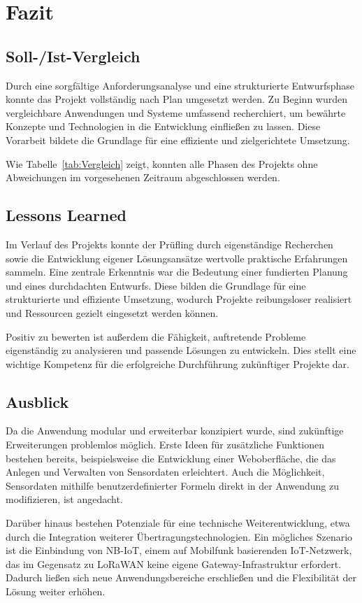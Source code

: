 \section{Fazit} 
\label{sec:Fazit}

\subsection{Soll-/Ist-Vergleich}
\label{sec:SollIstVergleich}
	Durch eine sorgfältige Anforderungsanalyse und eine strukturierte Entwurfsphase konnte das Projekt vollständig nach Plan umgesetzt werden.
	Zu Beginn wurden vergleichbare Anwendungen und Systeme umfassend recherchiert,
	um bewährte Konzepte und Technologien in die Entwicklung einfließen zu lassen.
	Diese Vorarbeit bildete die Grundlage für eine effiziente und zielgerichtete Umsetzung.

	Wie Tabelle~\ref{tab:Vergleich} zeigt, konnten alle Phasen des Projekts ohne Abweichungen im vorgesehenen Zeitraum abgeschlossen werden.
	

\subsection{Lessons Learned}
\label{sec:LessonsLearned}
	Im Verlauf des Projekts konnte der Prüfling durch eigenständige Recherchen sowie die Entwicklung eigener Lösungsansätze
	wertvolle praktische Erfahrungen sammeln. Eine zentrale Erkenntnis war die Bedeutung einer fundierten Planung und eines durchdachten Entwurfs.
	Diese bilden die Grundlage für eine strukturierte und effiziente Umsetzung,
	wodurch Projekte reibungsloser realisiert und Ressourcen gezielt eingesetzt werden können.

	Positiv zu bewerten ist außerdem die Fähigkeit, auftretende Probleme eigenständig zu analysieren und passende Lösungen zu entwickeln.
	Dies stellt eine wichtige Kompetenz für die erfolgreiche Durchführung zukünftiger Projekte dar.


\subsection{Ausblick}
\label{sec:Ausblick}
	Da die Anwendung modular und erweiterbar konzipiert wurde, sind zukünftige Erweiterungen problemlos möglich.
	Erste Ideen für zusätzliche Funktionen bestehen bereits, beispielsweise die Entwicklung einer Weboberfläche,
	die das Anlegen und Verwalten von Sensordaten erleichtert. Auch die Möglichkeit,
	Sensordaten mithilfe benutzerdefinierter Formeln direkt in der Anwendung zu modifizieren, ist angedacht.

	Darüber hinaus bestehen Potenziale für eine technische Weiterentwicklung,
	etwa durch die Integration weiterer Übertragungstechnologien.
	Ein mögliches Szenario ist die Einbindung von NB-IoT, einem auf Mobilfunk basierenden IoT-Netzwerk,
	das im Gegensatz zu LoRaWAN keine eigene Gateway-Infrastruktur erfordert.
	Dadurch ließen sich neue Anwendungsbereiche erschließen und die Flexibilität der Lösung weiter erhöhen.
